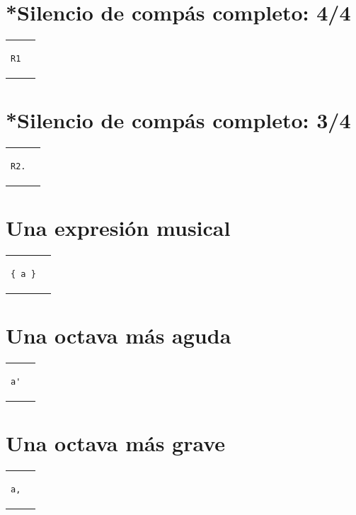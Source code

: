 \documentclass[a4paper,10pt,oneside,headinclude,titlepage]{article} %
\begin{document}
\section*{*Silencio de compás completo: 4/4}
\begin{tabular}{m{2cm}m{2cm}}
\begin{verbatim}
R1
\end{verbatim}
&
\begin[fragment]{lilypond}
R1
\end{lilypond}
\end{tabular}

\section*{*Silencio de compás completo: 3/4}
\begin{tabular}{m{2cm}m{2cm}}
\begin{verbatim}
R2.
\end{verbatim}
&
\begin[fragment]{lilypond}
\time 3/4 R2.
\end{lilypond}
\end{tabular}

\section*{Una expresión musical}
\begin{tabular}{m{2cm}m{2cm}}
\begin{verbatim}
{ a }
\end{verbatim}
&
\begin[fragment]{lilypond}
{ a }
\end{lilypond}
\end{tabular}

\section*{Una octava más aguda}
\begin{tabular}{m{2cm}m{2cm}}
\begin{verbatim}
a'
\end{verbatim}
&
\begin[fragment]{lilypond}
a'
\end{lilypond}
\end{tabular}

\section*{Una octava más grave}
\begin{tabular}{m{2cm}m{2cm}}
\begin{verbatim}
a,
\end{verbatim}
&
\begin[fragment]{lilypond}
a,
\end{lilypond}
\end{tabular}
\end{document}
